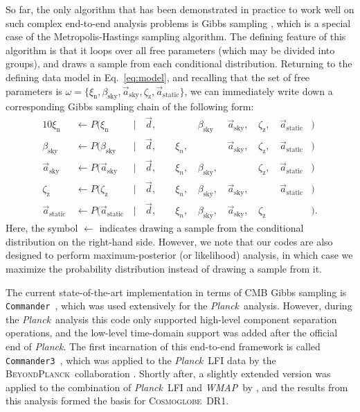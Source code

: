 \documentclass{aa}
\def\Cosmoglobe{\textsc{Cosmoglobe}}
\def\commanderthree{\texttt{Commander3}}
\def\commander{\texttt{Commander}}
\def\Planck{\textit{Planck}}
\def\WMAP{\textit{WMAP}}
\newcommand{\dv}[0]{\vec{d}}
\renewcommand{\a}[0]{\vec{a}}
\newcommand{\BP}{\textsc{BeyondPlanck}}
\begin{document}
So far, the only algorithm that has been demonstrated in practice to
work well on such complex end-to-end analysis problems
\citep{bp01,watts2023_dr1} is Gibbs sampling
\citep[e.g.,][]{geman:1984}, which is a special case of the
Metropolis-Hastings sampling algorithm. The defining
feature of this algorithm is that it loops over all free parameters
(which may be divided into groups), and draws a sample from each
conditional distribution. Returning to the defining data model in
Eq.~\eqref{eq:model}, and recalling that the set of
free parameters is $\omega = \{\xi_{\mathrm{n}},
\beta_{\mathrm{sky}},\a_{\mathrm{sky}},\zeta_{\mathrm{z}},\a_{\mathrm{static}}\}$,
we can immediately write down a corresponding Gibbs sampling chain of
the following form:
\begin{alignat}{10}
\xi_{\mathrm{n}} &\,\leftarrow P(\xi_{\mathrm{n}}&\,\mid &\,\dv,&\, &\,\phantom{\xi_n} &
\,\beta_{\mathrm{sky}}& \,\a_{\mathrm{sky}}, &\,\zeta_{\mathrm{z}},
&\,\a_{\mathrm{static}}&)\label{eq:gibbs_n}\\
\beta_{\mathrm{sky}} &\,\leftarrow P(\beta_{\mathrm{sky}}&\,\mid &\,\dv,&\, &\,\xi_n, &
\,\phantom{\beta_{\mathrm{sky}}}& \,\a_{\mathrm{sky}}, &\,\zeta_{\mathrm{z}}, &\,\a_{\mathrm{static}}&)\\
\a_{\mathrm{sky}} &\,\leftarrow P(\a_{\mathrm{sky}}&\,\mid &\,\dv,&\, &\,\xi_n, &
\,\beta_{\mathrm{sky}},& \,\phantom{\a_{\mathrm{sky}},}
&\,\zeta_{\mathrm{z}}, &\,\a_{\mathrm{static}}&)\\
\zeta_{\mathrm{z}} &\,\leftarrow P(\zeta_{\mathrm{z}}&\,\mid &\,\dv,&\, &\,\xi_n, &
\,\beta_{\mathrm{sky}},& \,\a_{\mathrm{sky}},
&\,\phantom{\zeta_{\mathrm{z}},} &\,\a_{\mathrm{static}}&)\label{eq:gibbs_zodi}\\
\a_{\mathrm{static}} &\,\leftarrow P(\a_{\mathrm{static}}&\,\mid &\,\dv,&\, &\,\xi_n, &
\,\beta_{\mathrm{sky}},& \,\a_{\mathrm{sky}}, &\,\zeta_{\mathrm{z}} &\,\phantom{\a_{\mathrm{static}}}&).\label{eq:gibbs_static}
\end{alignat}
Here, the symbol $\leftarrow$ indicates drawing a sample from the
conditional distribution on the right-hand side. However, we note that
our codes are also designed to perform maximum-posterior (or
likelihood) analysis, in which case we maximize the probability
distribution instead of drawing a sample from it.

The current state-of-the-art implementation in terms of CMB Gibbs sampling
is \commander\ \citep{Eriksen:2004ss}, which was used
extensively for the \Planck\ analysis. However, during the
\Planck\ analysis this code only supported high-level component
separation operations, and the low-level time-domain support was added
after the official end of \Planck. The first incarnation of this
end-to-end framework is called \commanderthree\ \citep{bp03}, which
was applied to the \Planck\ LFI data by the \BP\ collaboration
\citep{bp01}. Shortly after, a slightly extended version was applied
to the combination of \Planck\ LFI and \WMAP\ by
\citet{watts2023_dr1}, and the results from this analysis formed the
basis for \Cosmoglobe\ DR1. 
\end{document}
